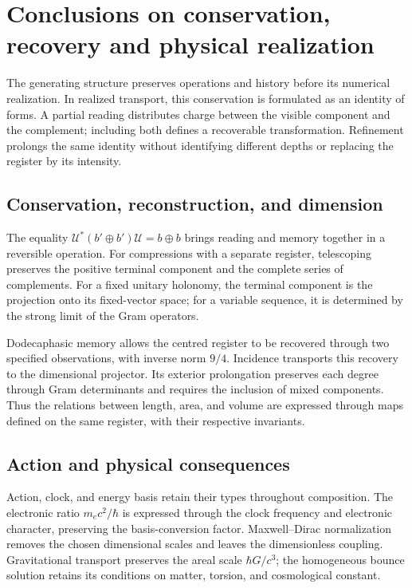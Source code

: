 \chapter{Conclusions on conservation, recovery and physical realization}
\label{x_reciprocidad:nuclear:sintesis}
The generating structure preserves operations and history before its numerical realization. In realized transport, this conservation is formulated as an identity of forms. A partial reading distributes charge between the visible component and the complement; including both defines a recoverable transformation. Refinement prolongs the same identity without identifying different depths or replacing the register by its intensity.

\section{Conservation, reconstruction, and dimension}
The equality \(\mathcal U^*(b'\oplus b')\mathcal U=b\oplus b\) brings reading and memory together in a reversible operation. For compressions with a separate register, telescoping preserves the positive terminal component and the complete series of complements. For a fixed unitary holonomy, the terminal component is the projection onto its fixed-vector space; for a variable sequence, it is determined by the strong limit of the Gram operators.

Dodecaphasic memory allows the centred register to be recovered through two specified observations, with inverse norm \(9/4\). Incidence transports this recovery to the dimensional projector. Its exterior prolongation preserves each degree through Gram determinants and requires the inclusion of mixed components. Thus the relations between length, area, and volume are expressed through maps defined on the same register, with their respective invariants.

\section{Action and physical consequences}
Action, clock, and energy basis retain their types throughout composition. The electronic ratio \(m_ec^2/\hbar\) is expressed through the clock frequency and electronic character, preserving the basis-conversion factor. Maxwell--Dirac normalization removes the chosen dimensional scales and leaves the dimensionless coupling. Gravitational transport preserves the areal scale \(\hbar G/c^3\); the homogeneous bounce solution retains its conditions on matter, torsion, and cosmological constant.

